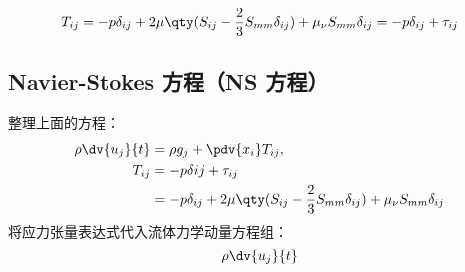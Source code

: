 \begin{equation}
T_{ij}=-p\delta_{ij}+2\mu \qty(S_{ij}-\frac{2}{3}S_{mm}\delta_{ij})+\mu_\nu S_{mm} \delta_{ij}=-p\delta_{ij}+\tau_{ij}
\end{equation}

\subsection{Navier-Stokes 方程（NS 方程）}
整理上面的方程：
\begin{equation}
\begin{aligned}
\rho \dv{u_j}{t}&=\rho g_j+\pdv{x_i} T_{ij},\\
T_{ij}&=-p\delta{ij}+\tau_{ij}\\
&=-p\delta_{ij}+2\mu \qty(S_{ij}-\frac{2}{3}S_{mm}\delta_{ij})+\mu_\nu S_{mm} \delta_{ij}
\end{aligned}
\end{equation}
将应力张量表达式代入流体力学动量方程组：
\begin{equation}
\rho \dv{u_j}{t}
\end{equation}

